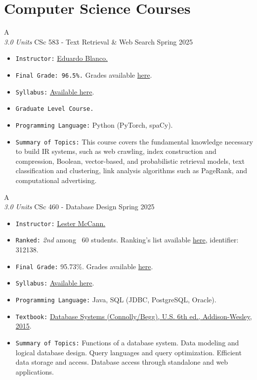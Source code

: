 \section{Computer Science Courses}

\cventry
{A \\ \small{\textit{3.0 Units}}}
{CSc 583 -  Text Retrieval \& Web Search}
{Spring 2025}
{}
{}
{
  \begin{itemize}
    \item \texttt{Instructor:} \href{https://eduardoblanco.github.io/}{Eduardo Blanco.}
    \item \texttt{Final Grade: 96.5\%.} Grades available \href{https://mhrezaei.com/assets/cv/courses/Spring2025/CSC583/Grades.pdf}{here}.
    \item \texttt{Syllabus:} \href{https://mhrezaei.com/assets/cv/courses/Spring2025/CSC583/Syllabus.pdf}{Available here}.
    \item \texttt{Graduate Level Course.}
    \item \texttt{Programming Language:} Python (PyTorch, spaCy).
    \item \texttt{Summary of Topics:} This course covers the fundamental
    knowledge necessary to build IR systems, such as web crawling, index
    construction and compression, Boolean, vector-based, and probabilistic
    retrieval models, text classification and clustering, link analysis
    algorithms such as PageRank, and computational advertising.
  \end{itemize}
}

\cventry
{A \\ \small{\textit{3.0 Units}}}
{CSc 460 - Database Design}
{Spring 2025}
{}
{}
{
  \begin{itemize}
    \item \texttt{Instructor:} \href{http://mccann.cs.arizona.edu}{Lester McCann.}
    \item \texttt{Ranked:} \textit{2nd} among ~60 students. Ranking's list available \href{https://mhrezaei.com/assets/cv/courses/Spring2025/CSC460/Rankings.pdf}{here}, identifier: 312138.
    \item \texttt{Final Grade:} 95.73\%. Grades available \href{https://mhrezaei.com/assets/cv/courses/Spring2025/CSC460/Grades.pdf}{here}.
    \item \texttt{Syllabus:} \href{https://mhrezaei.com/assets/cv/courses/Spring2025/CSC460/Syllabus.pdf}{Available here}.
    \item \texttt{Programming Language:} Java, SQL (JDBC, PostgreSQL, Oracle).
    \item \texttt{Textbook:} \href{https://media.pearsoncmg.com/aw/wps-wraps/ecs_connollyb_database_6/cw/}{Database Systems (Connolly/Begg), U.S. 6th ed., Addison-Wesley, 2015}.
    \item \texttt{Summary of Topics:} Functions of a database system. Data modeling and logical database design. Query languages and query optimization. Efficient data storage and access. Database access through standalone and web applications. 
  \end{itemize}
}

